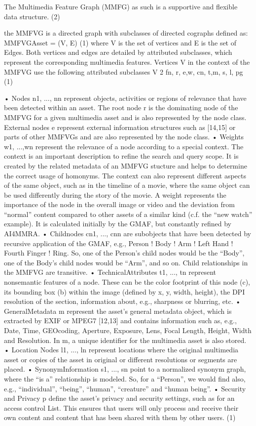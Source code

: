 The Multimedia Feature Graph (MMFG) as such is a supportive and flexible data structure. (2)

the MMFVG is a directed graph with subclasses of directed cographs defined as:
MMFVGAsset = (V, E) (1)
where V is the set of vertices and E is the set of Edges. Both vertices and edges are
detailed by attributed subclasses, which represent the corresponding multimedia features.
Vertices V in the context of the MMFVG use the following attributed subclasses V 2
fn, r, e,w, cn, t,m, s, l, pg (1)

• Nodes n1, ..., nn represent objects, activities or regions of relevance that have been
detected within an asset. The root node r is the dominating node of the MMFVG for a
given multimedia asset and is also represented by the node class. External nodes e
represent external information structures such as [14,15] or parts of other MMFVGs
and are also represented by the node class.
• Weights w1, ...,wn represent the relevance of a node according to a special context.
The context is an important description to refine the search and query scope. It is
created by the related metadata of an MMFVG stucture and helps to determine the
correct usage of homonyms. The context can also represent different aspects of the
same object, such as in the timeline of a movie, where the same object can be used
differently during the story of the movie. A weight represents the importance of the
node in the overall image or video and the deviation from “normal” content compared
to other assets of a similar kind (c.f. the “new watch” example). It is calculated initially
by the GMAF, but constantly refined by AI4MMRA.
• Childnodes cn1, ..., cnn are subobjects that have been detected by recursive application
of the GMAF, e.g., Person ! Body ! Arm ! Left Hand ! Fourth Finger !
Ring. So, one of the Person’s child nodes would be the “Body”, one of the Body’s child
nodes would be “Arm”, and so on. Child relationships in the MMFVG are transitive.
• TechnicalAttributes t1, ..., tn represent nonsemantic features of a node. These can be
the color footprint of this node (c), its bounding box (b) within the image (defined by x,
y, width, height), the DPI resolution of the section, information about, e.g., sharpness
or blurring, etc.
• GeneralMetadata m represent the asset’s general metadata object, which is extracted
by EXIF or MPEG7 [12,13] and contains information such as, e.g., Date, Time, GEOcoding,
Aperture, Exposure, Lens, Focal Length, Height, Width and Resolution. In m,
a unique identifier for the multimedia asset is also stored.
• Location Nodes l1, ..., ln represent locations where the original multimedia asset or
copies of the asset in original or different resolutions or segments are placed.
• SynonymInformation s1, ..., sn point to a normalized synonym graph, where the “is
a” relationship is modeled. So, for a “Person”, we would find also, e.g., “individual”,
“being”, “human”, “creature” and “human being”.
• Security and Privacy p define the asset’s privacy and security settings, such as for an
access control List. This ensures that users will only process and receive their own
content and content that has been shared with them by other users. (1)

